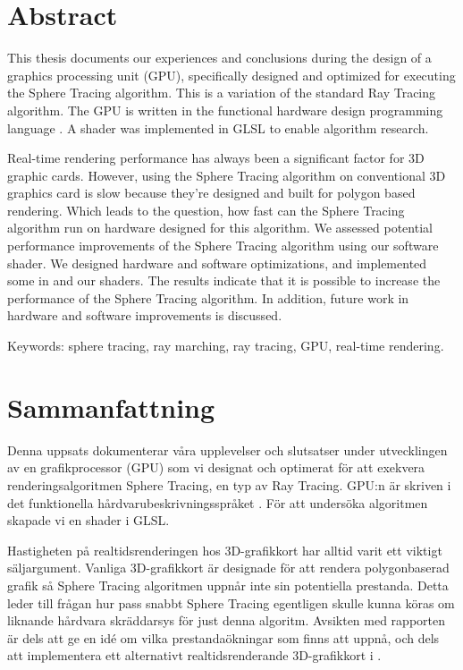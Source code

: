 \thispagestyle{plain}			%
\setlength{\parskip}{10pt}
\setlength{\parindent}{0pt}

\section*{Abstract}



	This thesis documents our experiences and conclusions during the design of  
	a graphics processing unit (GPU), specifically designed and optimized for 
	executing the Sphere Tracing algorithm. This is a variation of the standard Ray Tracing algorithm. The GPU is written 
	in the functional hardware design programming language \clash. A shader was 
	implemented in GLSL to enable algorithm research.
	
	Real-time rendering performance has always been a significant factor for 3D
	graphic cards. However, using the Sphere Tracing algorithm on conventional 3D graphics card is slow because they're designed and built for polygon based rendering. Which leads to the question, how fast can the Sphere Tracing 
	algorithm run on hardware designed for this algorithm. We assessed 
	potential performance improvements of the Sphere Tracing algorithm using 
	our software shader. We designed hardware and software optimizations, and 
	implemented some in \clash and our shaders. The results indicate that it is 
	possible to increase the performance of the Sphere Tracing algorithm. In 
	addition, future work in hardware and software improvements is discussed.

	\vfill
	Keywords: sphere tracing, ray marching, ray tracing, GPU, real-time rendering.

\newpage
\thispagestyle{plain}

\section*{Sammanfattning}
	
	Denna uppsats dokumenterar våra upplevelser och slutsatser under 
	utvecklingen av en grafikprocessor (GPU) som vi	designat och optimerat 
	för att exekvera renderingsalgoritmen Sphere Tracing, en typ av Ray 
	Tracing. GPU:n är skriven i det funktionella hårdvarubeskrivningsspråket 
	\clash. För att undersöka algoritmen skapade vi en shader i GLSL.
	
	Hastigheten på realtidsrenderingen hos 3D-grafikkort har alltid varit ett
	viktigt säljargument. Vanliga 3D-grafikkort är designade för att rendera polygonbaserad grafik så Sphere Tracing algoritmen uppnår inte sin potentiella prestanda. Detta leder till frågan hur pass snabbt Sphere Tracing 
	egentligen skulle kunna köras om liknande hårdvara skräddarsys för just 
	denna algoritm. Avsikten med rapporten är dels att ge en idé om vilka 
	prestandaökningar som finns att uppnå, och dels att implementera ett
	alternativt realtidsrenderande 3D-grafikkort i \clash. 
	

